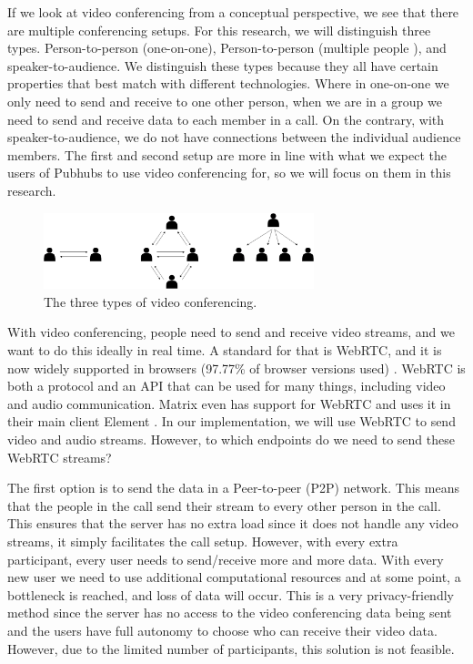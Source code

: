 \documentclass{report}
\begin{document}
If we look at video conferencing from a conceptual perspective, we see that there are multiple conferencing setups.
For this research, we will distinguish three types. Person-to-person (one-on-one), Person-to-person (multiple people
), and speaker-to-audience. We distinguish these types because they all have certain properties that best match with
different technologies. Where in one-on-one we only need to send and receive to one other person, when we are in a
group we need to send and receive data to each member in a call. On the contrary, with speaker-to-audience, we do
not have connections between the individual audience members. The first and second setup are more in line with what
we expect the users of Pubhubs to use video conferencing for, so we will focus on them in this research.

\begin{figure}[!hbt]
\centering
\includegraphics[width=0.7\textwidth]{img/three-types}
\caption{The three types of video conferencing.}
\label{fig:three-types-video-conferencing}
\end{figure}

With video conferencing, people need to send and receive video streams, and we want to do this ideally in real time.
A standard for that is WebRTC, and it is now widely supported in browsers (97.77\% of browser versions used) \cite{
CIUIWEBRTC}. WebRTC is both a protocol and an API that can be used for many things, including video and audio communication.
Matrix even has support for WebRTC and uses it in their main client Element \cite{ELEMENT}. In our
implementation, we will use WebRTC to send video and audio streams. However, to which endpoints do we need
to send these WebRTC streams?

The first option is to send the data in a Peer-to-peer (P2P) network. This means that the people in the call send
their stream to every other person in the call. This ensures that the server has no extra load since it does not
handle any video streams, it simply facilitates the call setup. However, with every extra participant, every user
needs to send/receive more and more data. With every new user we need to use additional computational resources and at
some point, a bottleneck is reached, and loss of data will occur. This is a very privacy-friendly method since the
server has no access to the video conferencing data being sent and the users have full autonomy to choose who can
receive their video data. However, due to the limited number of participants, this solution is not feasible.
\end{document}
